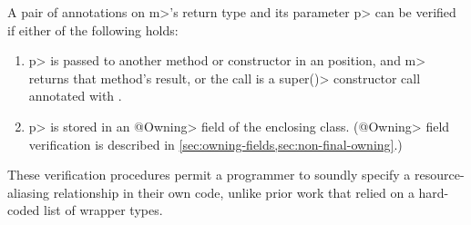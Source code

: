 A pair of \MustCallAlias annotations on
\<m>'s return type
and its parameter \<p> can be verified if either of the following holds:
\begin{enumerate}
\item \<p> is passed to another method or constructor in an
  \MustCallAlias position, and \<m> returns that method's result,
  or the call is a \<super()> constructor call annotated
  with \MustCallAlias.
\item \<p> is stored in an \<@Owning> field of the enclosing class.  (\<@Owning>
field verification is described in \cref{sec:owning-fields,sec:non-final-owning}.)
\end{enumerate}
These verification procedures permit a programmer to soundly specify a resource-aliasing
relationship in their own code, unlike prior work
that relied on a hard-coded list of wrapper types.



